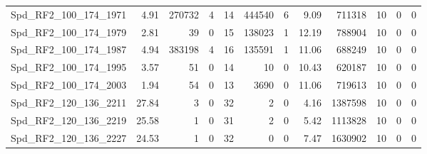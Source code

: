 \begin{longtable}[c]{@{}lrrrrrrrrrrr@{}}
Spd\_RF2\_100\_174\_1971      & 4.91                   & 270732                  & 4                       & 14                     & 444540                  & 6                       & 9.09                    & 711318                   & 10                       & 0                        & 0                        \\
Spd\_RF2\_100\_174\_1979      & 2.81                   & 39                      & 0                       & 15                     & 138023                  & 1                       & 12.19                   & 788904                   & 10                       & 0                        & 0                        \\
Spd\_RF2\_100\_174\_1987      & 4.94                   & 383198                  & 4                       & 16                     & 135591                  & 1                       & 11.06                   & 688249                   & 10                       & 0                        & 0                        \\
Spd\_RF2\_100\_174\_1995      & 3.57                   & 51                      & 0                       & 14                     & 10                      & 0                       & 10.43                   & 620187                   & 10                       & 0                        & 0                        \\
Spd\_RF2\_100\_174\_2003      & 1.94                   & 54                      & 0                       & 13                     & 3690                    & 0                       & 11.06                   & 719613                   & 10                       & 0                        & 0                        \\
Spd\_RF2\_120\_136\_2211      & 27.84                  & 3                       & 0                       & 32                     & 2                       & 0                       & 4.16                    & 1387598                  & 10                       & 0                        & 0                        \\
Spd\_RF2\_120\_136\_2219      & 25.58                  & 1                       & 0                       & 31                     & 2                       & 0                       & 5.42                    & 1113828                  & 10                       & 0                        & 0                        \\
Spd\_RF2\_120\_136\_2227      & 24.53                  & 1                       & 0                       & 32                     & 0                       & 0                       & 7.47                    & 1630902                  & 10                       & 0                        & 0                        \\

\end{longtable}
